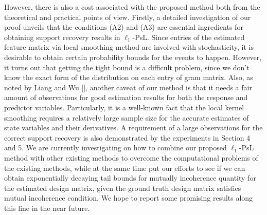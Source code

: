 \documentclass[a4paper,11pt]{article}
\begin{document}
However, there is also a cost associated with the proposed method both from the theoretical and practical points of view. Firstly, a detailed investigation of our proof unveils that the conditions (A2) and (A3) are essential ingredients for obtaining support recovery results in $\ell_{1}$-PsL. Since entries of the estimated feature matrix via local smoothing method are involved with stochasticity, it is desirable to obtain certain probability bounds for the events to happen. However, it turns out that getting the tight bound is a difficult problem, since we don’t know the exact form of the distribution on each entry of gram matrix. Also, as noted by Liang and Wu [], another caveat of our method is that it needs a fair amount of observations for good estimation results for both the response and predictor variables. Particularly, it is a well-known fact that the local kernel smoothing requires a relatively large sample size for the accurate estimates of state variables and their derivatives. A requirement of a large observations for the correct support recovery is also demonstrated by the experiments in Section 4 and 5. We are currently investigating on how to combine our proposed $\ell_{1}$-PsL method with other existing methods to overcome the computational problems of the existing methods, while at the same time put our efforts to see if we can obtain exponentially decaying tail bounds for mutually incoherence quantity for the estimated design matrix, given the ground truth design matrix satisfies mutual incoherence condition. We hope to report some promising results along this line in the near future.

\appendix
\end{document}
